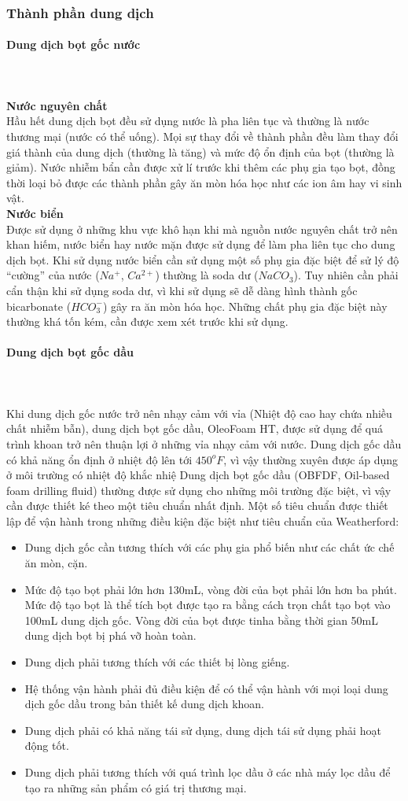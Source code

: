 \documentclass[12pt,a4paper]{article}
\newcommand{\subsubsubsection}[1]{\paragraph{#1}\mbox{}\\}
\begin{document}
\subsubsection{Thành phần dung dịch}
	\subsubsubsection{Dung dịch bọt gốc nước}\\
	\textbf{Nước nguyên chất}\\
	Hầu hết dung dịch bọt đều sử dụng nước là pha liên tục và thường là nước thương mại (nước có thể uống). Mọi sự thay đổi về thành phần đều làm thay đổi giá thành của dung dịch (thường là tăng) và mức độ ổn định của bọt (thường là giảm). Nước nhiễm bẩn cần được xử lí trước khi thêm các phụ gia tạo bọt, đồng thời loại bỏ được các thành phần gây ăn mòn hóa học như các ion âm hay vi sinh vật.\\
	\textbf{Nước biển}\\
	Được sử dụng ở những khu vực khô hạn khi mà nguồn nước nguyên chất trở nên khan hiếm, nước biển hay nước mặn được sử dụng để làm pha liên tục cho dung dịch bọt. Khi sử dụng nước biển cần sử dụng một số phụ gia đặc biệt để sử lý độ “cường” của nước ($Na^+$, $Ca^{2+}$) thường là soda dư ($NaCO_3$). Tuy nhiên cần phải cẩn thận khi sử dụng soda dư, vì khi sử dụng sẽ dễ dàng hình thành gốc bicarbonate ($HCO_3^-$) gây ra ăn mòn hóa học. Những chất phụ gia đặc biệt này thường khá tốn kém, cần được xem xét trước khi sử dụng.
	\subsubsubsection{Dung dịch bọt gốc dầu}\\
	Khi dung dịch gốc nước trở nên nhạy cảm với vỉa (Nhiệt độ cao hay chứa nhiều chất nhiễm bẫn), dung dịch bọt gốc dầu, OleoFoam HT, được sử dụng để quá trình khoan trở nên thuận lợi ở những vỉa nhạy cảm với nước. Dung dịch gốc dầu có khả năng ổn định ở nhiệt độ lên tới $450^oF$, vì vậy thường xuyên được áp dụng ở môi trường có nhiệt độ khắc nhiệ
	Dung dịch bọt gốc dầu (OBFDF, Oil-based foam drilling fluid) thường được sử dụng cho những môi trường đặc biệt, vì vậy cần được thiết ké theo một tiêu chuẩn nhất định. Một số tiêu chuẩn được thiết lập để vận hành trong những điều kiện đặc biệt như tiêu chuẩn của Weatherford:
	\begin{itemize}
		\item Dung dịch gốc cần tương thích với các phụ gia phổ biến như các chất ức chế ăn mòn, cặn.
		\item Mức độ tạo bọt phải lớn hơn 130mL, vòng đời của bọt phải lớn hơn ba phút. Mức độ tạo bọt là thể tích bọt được tạo ra bằng cách trọn chất tạo bọt vào 100mL dung dịch gốc. Vòng đời của bọt được tinha bằng thời gian 50mL dung dịch bọt bị phá vỡ hoàn toàn.
		\item Dung dịch phải tương thích với các thiết bị lòng giếng.
		\item Hệ thống vận hành phải đủ điều kiện để có thể vận hành với mọi loại dung dịch gốc dầu trong bản thiết kế dung dịch khoan.
		\item Dung dịch phải có khả năng tái sử dụng, dung dịch tái sử dụng phải hoạt động tốt.
		\item Dung dịch phải tương thích với quá trình lọc dầu ở các nhà máy lọc dầu để tạo ra những sản phẩm có giá trị thương mại.
	\end{itemize}
\end{document}

